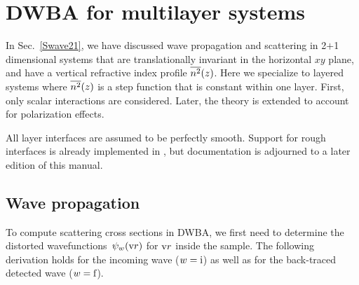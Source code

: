 

\chapter{DWBA for multilayer systems}  \label{sec:Multilayers}


%

In Sec.~\ref{Swave21},
we have discussed wave propagation and scattering in 2$+$1 dimensional systems
that are translationally invariant in the horizontal $xy$ plane,
and have a vertical refractive index profile $\overline{n^2}(z)$.
Here we specialize to layered systems
where $\overline{n^2}(z)$ is a step function that is constant within one layer.
First, only scalar interactions are considered.
Later, the theory is extended to account for polarization effects.


All layer interfaces are assumed to be perfectly smooth.
Support for rough interfaces is already implemented in \BornAgain,
but documentation is adjourned to a later edition of this manual.

\section{Wave propagation}\label{Slayerprop}

To compute scattering cross sections in DWBA,
we first need to determine the distorted wavefunctions~$\psi_w(\text{v}{r})$
for $\text{v}{r}$ inside the sample.
The following derivation holds for the incoming wave ($w=\text{i}$)
as well as for the back-traced detected wave ($w=\text{f}$).

